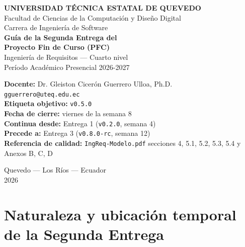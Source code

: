 \documentclass[11pt,a4paper]{article}
\begin{document}
\begin{center}
    \vspace*{1.2cm}
    {\Large\bfseries\textcolor{uteqverde}{UNIVERSIDAD T\'ECNICA ESTATAL DE QUEVEDO}}\\[4pt]
    {\large Facultad de Ciencias de la Computaci\'on y Dise\~no Digital}\\[2pt]
    {\large Carrera de Ingenier\'ia de Software}\\[22pt]

    {\LARGE\bfseries Gu\'ia de la Segunda Entrega del}\\[6pt]
    {\LARGE\bfseries Proyecto Fin de Curso (PFC)}\\[16pt]

    {\large Ingenier\'ia de Requisitos --- Cuarto nivel}\\[2pt]
    {\large Per\'iodo Acad\'emico Presencial 2026-2027}\\[22pt]

    \begin{tcolorbox}[colback=uteqverde!8,colframe=uteqverde,arc=3pt,
                      width=0.88\textwidth,boxrule=0.8pt]
        \centering
        \textbf{Docente:} Dr. Gleiston Cicer\'on Guerrero Ulloa, Ph.D.\\[2pt]
        \texttt{gguerrero@uteq.edu.ec}\\[6pt]
        \textbf{Etiqueta objetivo:} \texttt{v0.5.0}\\[2pt]
        \textbf{Fecha de cierre:} viernes de la semana 8\\[2pt]
        \textbf{Continua desde:} Entrega 1 (\texttt{v0.2.0}, semana 4)\\[2pt]
        \textbf{Precede a:} Entrega 3 (\texttt{v0.8.0-rc}, semana 12)\\[2pt]
        \textbf{Referencia de calidad:} \texttt{IngReq-Modelo.pdf} secciones 4, 5.1, 5.2, 5.3, 5.4 y Anexos B, C, D
    \end{tcolorbox}

    \vfill
    {\small Quevedo --- Los R\'ios --- Ecuador}\\[2pt]
    {\small 2026}
\end{center}

\newpage
\tableofcontents
\newpage

\section{Naturaleza y ubicaci\'on temporal de la Segunda Entrega}
\end{document}
